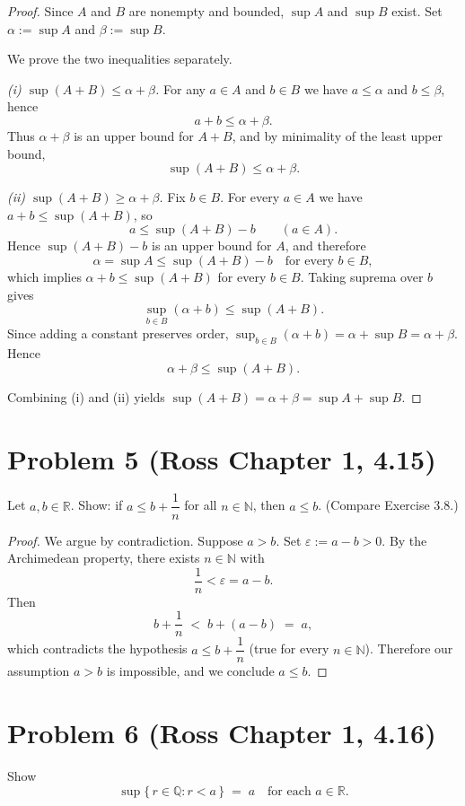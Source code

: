 \documentclass[12pt]{article}
\begin{document}
\begin{proof}
Since $A$ and $B$ are nonempty and bounded, $\sup A$ and $\sup B$ exist.  
Set $\alpha:=\sup A$ and $\beta:=\sup B$.

We prove the two inequalities separately.

\smallskip
\noindent\emph{(i) $\sup(A+B)\le \alpha+\beta$.}
For any $a\in A$ and $b\in B$ we have $a\le \alpha$ and $b\le \beta$, hence
\[
a+b\le \alpha+\beta.
\]
Thus $\alpha+\beta$ is an upper bound for $A+B$, and by minimality of the least upper bound,
\[
\sup(A+B)\le \alpha+\beta.
\]

\smallskip
\noindent\emph{(ii) $\sup(A+B)\ge \alpha+\beta$.}
Fix $b\in B$. For every $a\in A$ we have $a+b\le \sup(A+B)$, so
\[
a\le \sup(A+B)-b\qquad(a\in A).
\]
Hence $\sup(A+B)-b$ is an upper bound for $A$, and therefore
\[
\alpha=\sup A\le \sup(A+B)-b \quad\text{for every } b\in B,
\]
which implies $\alpha+b\le \sup(A+B)$ for every $b\in B$. Taking suprema over $b$ gives
\[
\sup_{b\in B}(\alpha+b)\le \sup(A+B).
\]
Since adding a constant preserves order, \(\sup_{b\in B}(\alpha+b)=\alpha+\sup B=\alpha+\beta\). Hence
\[
\alpha+\beta\le \sup(A+B).
\]

\smallskip
Combining (i) and (ii) yields \(\sup(A+B)=\alpha+\beta=\sup A+\sup B\).
\end{proof}

\vspace{3cm}

\section*{Problem 5 (Ross Chapter 1, 4.15)}
Let $a,b\in\mathbb{R}$. Show: if $a\le b+\dfrac{1}{n}$ for all $n\in\mathbb{N}$, then $a\le b$. 
(Compare Exercise 3.8.)

\begin{proof}
We argue by contradiction. Suppose $a>b$. Set $\varepsilon:=a-b>0$.  
By the Archimedean property, there exists $n\in\mathbb{N}$ with
\[
\frac{1}{n}<\varepsilon=a-b.
\]
Then
\[
b+\frac{1}{n}\;<\;b+(a-b)\;=\;a,
\]
which contradicts the hypothesis $a\le b+\dfrac{1}{n}$ (true for every $n\in\mathbb{N}$).  
Therefore our assumption $a>b$ is impossible, and we conclude $a\le b$.
\end{proof}


\section*{Problem 6 (Ross Chapter 1, 4.16)}
Show
\[
\sup\{\, r \in \mathbb{Q} : r < a \,\} \;=\; a
\quad\text{for each } a \in \mathbb{R}.
\]
\end{document}

